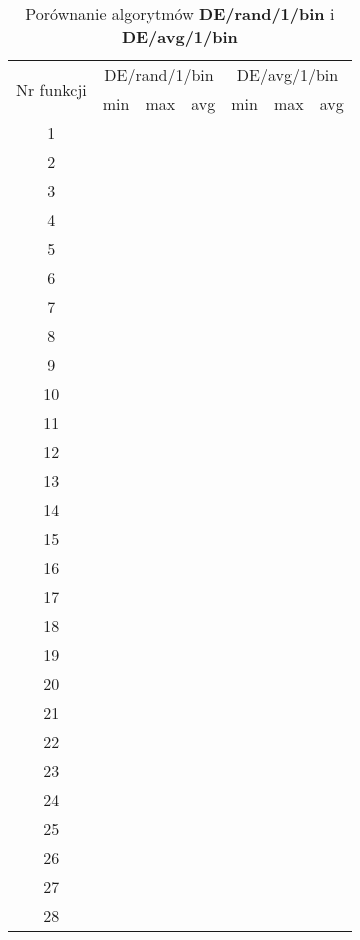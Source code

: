 \documentclass[a4paper,12pt]{article}
\theoremstyle{definition}
\begin{document}
\begin{table}[H]
\centering
\def\arraystretch{1.3}
\setlength\tabcolsep{10pt}
\caption{Porównanie algorytmów \textbf{DE/rand/1/bin} i \textbf{DE/avg/1/bin}}
\vspace{8pt}
\begin{tabular}{|c|c|c|c|c|c|c|}
	
	\hline
	\multirow{2}{*}{Nr funkcji} & \multicolumn{3}{c|}{DE/rand/1/bin} & \multicolumn{3}{c|}{DE/avg/1/bin}\\
	\cline{2-7}
	& min & max & avg & min & max & avg\\
	\hline
	1 &  &  &  &  &  &  \\
	\hline
	2 &  &  &  &  &  &  \\
	\hline
	3 &  &  &  &  &  &  \\
	\hline
	4 &  &  &  &  &  &  \\
	\hline
	5 &  &  &  &  &  &  \\
	\hline
	6 &  &  &  &  &  &  \\
	\hline
	7 &  &  &  &  &  &  \\
	\hline
	8 &  &  &  &  &  &  \\
	\hline
	9 &  &  &  &  &  &  \\
	\hline
	10 &  &  &  &  &  &  \\
	\hline
	11 &  &  &  &  &  &  \\
	\hline
	12 &  &  &  &  &  &  \\
	\hline
	13 &  &  &  &  &  &  \\
	\hline
	14 &  &  &  &  &  &  \\
	\hline
	15 &  &  &  &  &  &  \\
	\hline
	16 &  &  &  &  &  &  \\
	\hline
	17 &  &  &  &  &  &  \\
	\hline
	18 &  &  &  &  &  &  \\
	\hline
	19 &  &  &  &  &  &  \\
	\hline
	20 &  &  &  &  &  &  \\
	\hline
	21 &  &  &  &  &  &  \\
	\hline
	22 &  &  &  &  &  &  \\
	\hline
	23 &  &  &  &  &  &  \\
	\hline
	24 &  &  &  &  &  &  \\
	\hline
	25 &  &  &  &  &  &  \\
	\hline
	26 &  &  &  &  &  &  \\
	\hline
	27 &  &  &  &  &  &  \\
	\hline
	28 &  &  &  &  &  &  \\
	\hline
\end{tabular}	
\end{table}
\end{document}
